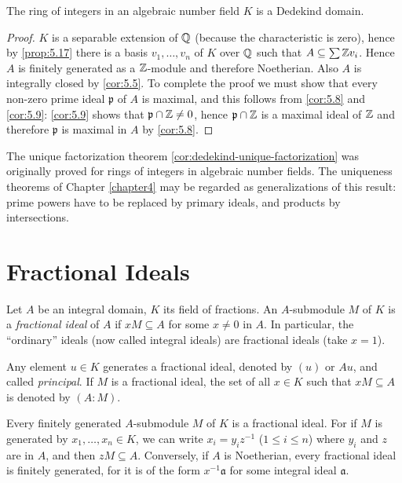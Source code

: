 \begin{theorem}\label{thm:ring-of-integers-dedekind}
The ring of integers in an algebraic number field $K$ is a Dedekind domain.
\end{theorem}

\begin{proof}
$K$ is a separable extension of $\mathbb{Q}$ (because the characteristic is zero), hence by \eqref{prop:5.17} there is a basis $v_1, \ldots, v_n$ of $K$ over $\mathbb{Q}$ such that $A \subseteq \sum \mathbb{Z} v_i$. Hence $A$ is finitely generated as a $\mathbb{Z}$-module and therefore Noetherian. Also $A$ is integrally closed by \eqref{cor:5.5}. To complete the proof we must show that every non-zero prime ideal $\mathfrak{p}$ of $A$ is maximal, and this follows from \eqref{cor:5.8} and \eqref{cor:5.9}: \eqref{cor:5.9} shows that $\mathfrak{p} \cap \mathbb{Z} \neq 0$, hence $\mathfrak{p} \cap \mathbb{Z}$ is a maximal ideal of $\mathbb{Z}$ and therefore $\mathfrak{p}$ is maximal in $A$ by \eqref{cor:5.8}.
\end{proof}

\begin{remark}
The unique factorization theorem \eqref{cor:dedekind-unique-factorization} was originally proved for rings of integers in algebraic number fields. The uniqueness theorems of Chapter \ref{chapter4} may be regarded as generalizations of this result: prime powers have to be replaced by primary ideals, and products by intersections.
\end{remark}

\section*{Fractional Ideals}
Let $A$ be an integral domain, $K$ its field of fractions. An $A$-submodule $M$ of $K$ is a \emph{fractional ideal} of $A$ if $xM \subseteq A$ for some $x \neq 0$ in $A$. In particular, the ``ordinary'' ideals (now called integral ideals) are fractional ideals (take $x = 1$).

Any element $u \in K$ generates a fractional ideal, denoted by $(u)$ or $Au$, and called \emph{principal}. If $M$ is a fractional ideal, the set of all $x \in K$ such that $xM \subseteq A$ is denoted by $(A : M)$.

Every finitely generated $A$-submodule $M$ of $K$ is a fractional ideal. For if $M$ is generated by $x_1, \ldots, x_n \in K$, we can write $x_i = y_i z^{-1}$ ($1 \leq i \leq n$) where $y_i$ and $z$ are in $A$, and then $zM \subseteq A$. Conversely, if $A$ is Noetherian, every fractional ideal is finitely generated, for it is of the form $x^{-1}\mathfrak{a}$ for some integral ideal $\mathfrak{a}$.

